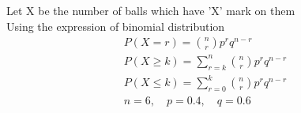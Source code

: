 Let X be the number of balls which have 'X' mark on them\\
Using the expression of binomial distribution
\begin{align}
    P(X = r) = {n \choose r} p^r q^{n-r}\\
    P(X \geq k) = \sum_{r = k}^n {n \choose r}p^r q^{n-r}\\
    P(X \leq k) = \sum_{r = 0}^k {n \choose r}p^r q^{n-r}\\
    n = 6,\quad p = 0.4,\quad q = 0.6
\end{align}
\begin{table}[]
\caption{Probabilities of each case }    \label{tab:my_label}
\end{table}
